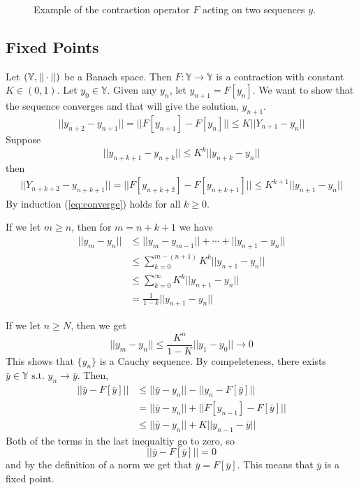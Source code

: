 \begin{figure}[ht!]
	\centering
	 \hfill
	\caption{Example of the contraction operator $F$ acting on two sequences $y$.}
	\label{fig:07contraction}
\end{figure}

\subsection{Fixed Points}
Let $(\mathbb{Y},||\cdot||)$ be a Banach space. Then $F:\mathbb{Y}\to\mathbb{Y}$ is a contraction with constant $K\in(0,1)$. Let $y_0\in\mathbb{Y}$. Given any $y_n$, let $y_{n+1}=F[y_n]$. We want to show that the sequence converges and that will give the solution, $y_{n+1}$.
$$||y_{n+2}-y_{n+1}|| = ||F[y_{n+1}]-F[y_n]|| \leq K||Y_{n+1}-y_n||$$
Suppose
$$||y_{n+k+1}-y_{n+k}||\leq K^k||y_{n+k}-y_n||$$
then
\begin{align}
\label{eq:converge}
||Y_{n+k+2}-y_{n+k+1}|| = ||F[y_{n+k+2}]-F[y_{n+k+1}]|| \leq K^{k+1}||y_{n+1}-y_n||
\end{align}
By induction (\ref{eq:converge}) holds for all $k\geq0$.

If we let $m\geq n$, then for $m=n+k+1$ we have
\begin{align*}
||y_m-y_n|| &\leq ||y_m-y_{m-1}|| + \cdots + ||y_{n+1}-y_n|| \\
&\leq \sum_{k=0}^{m-(n+1)} K^k||y_{n+1}-y_n|| \\
&\leq \sum_{k=0}^\infty K^k||y_{n+1}-y_n|| \\
&= \frac{1}{1-k}||y_{n+1}-y_n||
\end{align*}

If we let $n\geq N$, then we get
$$||y_m-y_n|| \leq \frac{K^n}{1-K}||y_1-y_0||\to0$$
This shows that $\{y_n\}$ is a Cauchy sequence. By compeleteness, there exists $\bar{y}\in\mathbb{Y}\text{ s.t. } y_n\to\bar{y}$. Then,
\begin{align*}
||\bar{y}-F[\bar{y}]|| &\leq ||\bar{y}-y_n|| - ||y_n-F[\bar{y}]|| \\
&= ||\bar{y}-y_n|| + ||F[y_{n-1}]-F[\bar{y}]|| \\
&\leq ||\bar{y}-y_n|| + K||y_{n-1}-\bar{y}||
\end{align*}
Both of the terms in the last inequaltiy go to zero, so
$$||\bar{y}-F[\bar{y}]|| = 0$$
and by the definition of a norm we get that $\bar{y}=F[\bar{y}]$. This means that $\bar{y}$ is a fixed point.

